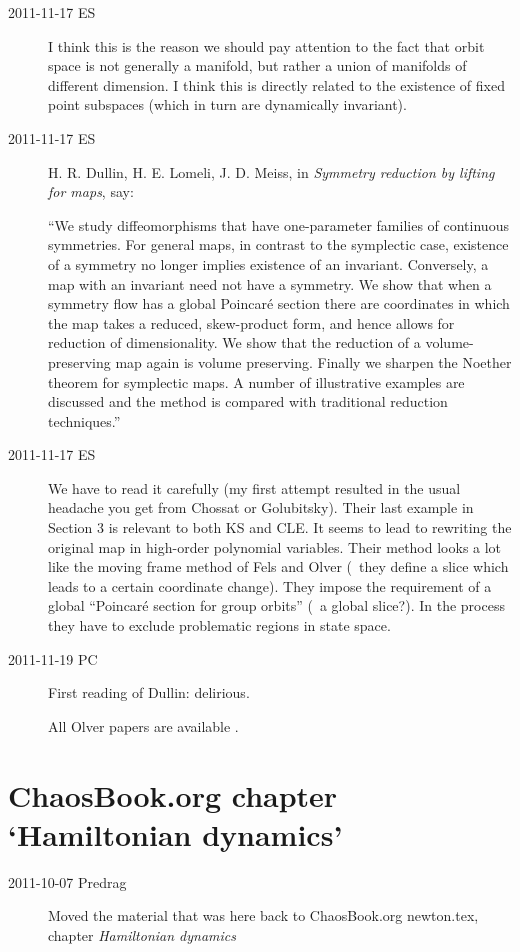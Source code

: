 \begin{description}
\item[2011-11-17 ES] I think this is the reason we should pay attention to the
fact that orbit space is not generally a manifold, but rather a union of manifolds
of different dimension. I think this is directly related to the existence of
fixed point subspaces (which in turn are dynamically invariant).


\item[2011-11-17 ES] H. R. Dullin, H. E. Lomeli, J. D. Meiss, in
\emph{Symmetry reduction by lifting for maps},
say:

``We study diffeomorphisms that have one-parameter families of continuous
symmetries. For general maps, in contrast to the symplectic case, existence of
a symmetry no longer implies existence of an invariant. Conversely, a map with
an invariant need not have a symmetry. We show that when a symmetry flow has a
global Poincar\'{e} section there are coordinates in which the map takes a
reduced, skew-product form, and hence allows for reduction of dimensionality.
We show that the reduction of a volume-preserving map again is volume
preserving. Finally we sharpen the Noether theorem for symplectic maps. A
number of illustrative examples are discussed and the method is compared with
traditional reduction techniques.''

\item[2011-11-17 ES] We have to read it carefully (my first attempt resulted in the
usual headache you get from Chossat or Golubitsky). Their last example in
Section 3 is relevant to both KS and CLE. It seems to lead to rewriting the original
map in high-order polynomial variables.
Their method looks a lot like the moving frame method of Fels and Olver 
(\ie\ they define a slice which leads to a certain coordinate change). They impose
the requirement of a global ``Poincar\'e section for group orbits'' (\ie\ a global slice?).
In the process they have to exclude problematic regions in state space.

\item[2011-11-19 PC] First reading of Dullin\etal{}: delirious.


All Olver papers are available
.

\end{description}


\section{ChaosBook.org chapter `Hamiltonian dynamics'}
\label{sect:toCB}

\begin{description}
\item[2011-10-07 Predrag]
Moved the material that was here back to ChaosBook.org newton.tex,
chapter {\em Hamiltonian dynamics}

\end{description}

\renewcommand{\LieEl}{\ensuremath{\gamma}}  %
\renewcommand{\ssp}{a}
